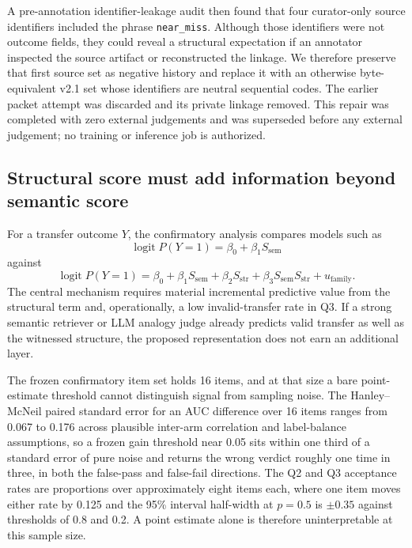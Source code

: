 A pre-annotation identifier-leakage audit then found that four curator-only source identifiers included the phrase \texttt{near\_miss}.  Although those identifiers were not outcome fields, they could reveal a structural expectation if an annotator inspected the source artifact or reconstructed the linkage.  We therefore preserve that first source set as negative history and replace it with an otherwise byte-equivalent v2.1 set whose identifiers are neutral sequential codes.  The earlier packet attempt was discarded and its private linkage removed.  This repair was completed with zero external judgements and was superseded before any external judgement; no training or inference job is authorized.

\subsection{Structural score must add information beyond semantic score}

For a transfer outcome $Y$, the confirmatory analysis compares models such as
\[
\operatorname{logit}P(Y=1)=\beta_0+\beta_1 S_{\mathrm{sem}}
\]
against
\[
\operatorname{logit}P(Y=1)=\beta_0+\beta_1 S_{\mathrm{sem}}+\beta_2 S_{\mathrm{str}}+\beta_3S_{\mathrm{sem}}S_{\mathrm{str}}+u_{\mathrm{family}}.
\]
The central mechanism requires material incremental predictive value from the structural term and, operationally, a low invalid-transfer rate in Q3. If a strong semantic retriever or LLM analogy judge already predicts valid transfer as well as the witnessed structure, the proposed representation does not earn an additional layer.

The frozen confirmatory item set holds 16 items, and at that size a bare point-estimate threshold cannot distinguish signal from sampling noise. The Hanley--McNeil paired standard error for an AUC difference over 16 items ranges from 0.067 to 0.176 across plausible inter-arm correlation and label-balance assumptions, so a frozen gain threshold near 0.05 sits within one third of a standard error of pure noise and returns the wrong verdict roughly one time in three, in both the false-pass and false-fail directions. The Q2 and Q3 acceptance rates are proportions over approximately eight items each, where one item moves either rate by 0.125 and the 95\% interval half-width at $p=0.5$ is $\pm 0.35$ against thresholds of 0.8 and 0.2. A point estimate alone is therefore uninterpretable at this sample size.


